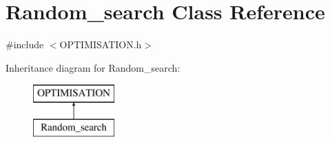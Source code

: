 \hypertarget{class_random__search}{}\section{Random\+\_\+search Class Reference}
\label{class_random__search}


{\ttfamily \#include $<$O\+P\+T\+I\+M\+I\+S\+A\+T\+I\+O\+N.\+h$>$}

Inheritance diagram for Random\+\_\+search\+:\begin{figure}[H]
\begin{center}
\leavevmode
\includegraphics[height=2.000000cm]{class_random__search}
\end{center}
\end{figure}
